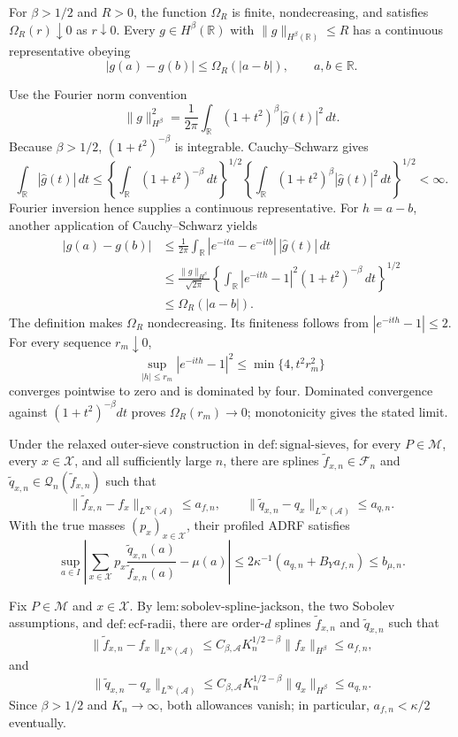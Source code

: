 For \(\beta>1/2\) and \(R>0\), the function \(\Omega_R\) is finite, nondecreasing, and satisfies \(\Omega_R(r)\downarrow0\) as \(r\downarrow0\). Every \(g\in H^\beta(\mathbb R)\) with \(\|g\|_{H^\beta(\mathbb R)}\le R\) has a continuous representative obeying
\[
 |g(a)-g(b)|\le\Omega_R(|a-b|),\qquad a,b\in\mathbb R.
\]

Use the Fourier norm convention
\[
 \|g\|_{H^\beta}^2=\frac1{2\pi}
 \int_{\mathbb R}(1+t^2)^\beta|\widehat g(t)|^2\,dt.
\]
Because \(\beta>1/2\), \((1+t^2)^{-\beta}\) is integrable. Cauchy--Schwarz gives
\[
 \int_{\mathbb R}|\widehat g(t)|\,dt
 \le
 \left\{\int_{\mathbb R}(1+t^2)^{-\beta}\,dt\right\}^{1/2}
 \left\{\int_{\mathbb R}(1+t^2)^\beta|\widehat g(t)|^2\,dt\right\}^{1/2}<\infty.
\]
Fourier inversion hence supplies a continuous representative. For \(h=a-b\), another application of Cauchy--Schwarz yields
\[
 \begin{aligned}
 |g(a)-g(b)|
 &\le \frac1{2\pi}\int_{\mathbb R}
       |e^{-ita}-e^{-itb}|\,|\widehat g(t)|\,dt\\
 &\le \frac{\|g\|_{H^\beta}}{\sqrt{2\pi}}
 \left\{\int_{\mathbb R}|e^{-ith}-1|^2(1+t^2)^{-\beta}\,dt\right\}^{1/2}\\
 &\le \Omega_R(|a-b|).
 \end{aligned}
\]
The definition makes \(\Omega_R\) nondecreasing. Its finiteness follows from \(|e^{-ith}-1|\le2\). For every sequence \(r_m\downarrow0\),
\[
 \sup_{|h|\le r_m}|e^{-ith}-1|^2\le\min\{4,t^2r_m^2\}
\]
converges pointwise to zero and is dominated by four. Dominated convergence against \((1+t^2)^{-\beta}dt\) proves \(\Omega_R(r_m)\to0\); monotonicity gives the stated limit.

Under the relaxed outer-sieve construction in \(\mathrm{def{:}signal\text{-}sieves}\), for every \(P\in\mathcal M\), every \(x\in\mathcal X\), and all sufficiently large \(n\), there are splines \(\widetilde f_{x,n}\in\mathscr F_n\) and \(\widetilde q_{x,n}\in\mathscr Q_n(\widetilde f_{x,n})\) such that
\[
 \|\widetilde f_{x,n}-f_x\|_{L^\infty(\mathcal A)}\le a_{f,n},
 \qquad
 \|\widetilde q_{x,n}-q_x\|_{L^\infty(\mathcal A)}\le a_{q,n}.
\]
With the true masses \((p_x)_{x\in\mathcal X}\), their profiled ADRF satisfies
\[
 \sup_{a\in I}\left|
 \sum_{x\in\mathcal X}p_x\frac{\widetilde q_{x,n}(a)}{\widetilde f_{x,n}(a)}-\mu(a)
 \right|
 \le 2\kappa^{-1}(a_{q,n}+B_Ya_{f,n})
 \le b_{\mu,n}.
\]

Fix \(P\in\mathcal M\) and \(x\in\mathcal X\). By \(\mathrm{lem{:}sobolev\text{-}spline\text{-}jackson}\), the two Sobolev assumptions, and \(\mathrm{def{:}ecf\text{-}radii}\), there are order-\(d\) splines \(\widetilde f_{x,n}\) and \(\widetilde q_{x,n}\) such that
\[
 \|\widetilde f_{x,n}-f_x\|_{L^\infty(\mathcal A)}
 \le C_{\beta,\mathcal A}K_n^{1/2-\beta}\|f_x\|_{H^\beta}
 \le a_{f,n},
\]
and
\[
 \|\widetilde q_{x,n}-q_x\|_{L^\infty(\mathcal A)}
 \le C_{\beta,\mathcal A}K_n^{1/2-\beta}\|q_x\|_{H^\beta}
 \le a_{q,n}.
\]
Since \(\beta>1/2\) and \(K_n\to\infty\), both allowances vanish; in particular, \(a_{f,n}<\kappa/2\) eventually.

